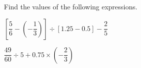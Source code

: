  Find the values of the following expressions.

\begin{subparts}
  \item $\left[\dfrac{5}{6} - \left(-\dfrac{1}{3}\right)\right] \div \left[1.25 - 0.5\right] - \dfrac{2}{5}$

  \item $\dfrac{49}{60} \div 5 + 0.75 \times \left(-\dfrac{2}{3}\right)$
\end{subparts}

